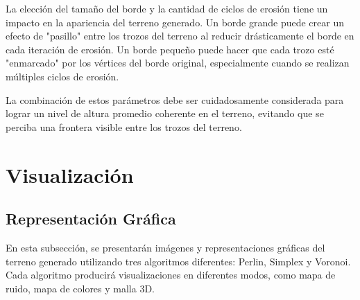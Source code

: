 La elección del tamaño del borde y la cantidad de ciclos de erosión tiene un impacto en la apariencia del terreno generado. Un borde grande puede crear un efecto de "pasillo" entre los trozos del terreno al reducir drásticamente el borde en cada iteración de erosión. Un borde pequeño puede hacer que cada trozo esté "enmarcado" por los vértices del borde original, especialmente cuando se realizan múltiples ciclos de erosión.

La combinación de estos parámetros debe ser cuidadosamente considerada para lograr un nivel de altura promedio coherente en el terreno, evitando que se perciba una frontera visible entre los trozos del terreno.

\section{Visualización}
\subsection{Representación Gráfica}

En esta subsección, se presentarán imágenes y representaciones gráficas del terreno generado utilizando tres algoritmos diferentes: Perlin, Simplex y Voronoi. Cada algoritmo producirá visualizaciones en diferentes modos, como mapa de ruido, mapa de colores y malla 3D.

